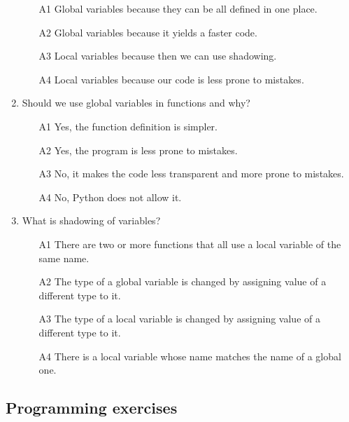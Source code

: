 \begin{enumerate}
\begin{enumerate}
\item[A1] Global variables because they can be all defined in one place.
\item[A2] Global variables because it yields a faster code.
\item[A3] Local variables because then we can use shadowing.
\item[A4] Local variables because our code is less prone to mistakes. 
\end{enumerate}
\item Should we use global variables in functions and why?
\begin{enumerate}
\item[A1] Yes, the function definition is simpler.
\item[A2] Yes, the program is less prone to mistakes.
\item[A3] No, it makes the code less transparent and more prone to mistakes.
\item[A4] No, Python does not allow it.
\end{enumerate}
\item What is shadowing of variables?
\begin{enumerate}
\item[A1] There are two or more functions that all use a local variable of the same name.
\item[A2] The type of a global variable is changed by assigning value of a different type to it. 
\item[A3] The type of a local variable is changed by assigning value of a different type to it. 
\item[A4] There is a local variable whose name matches the name of a global one.
\end{enumerate}
\end{enumerate}

\subsection{Programming exercises}

